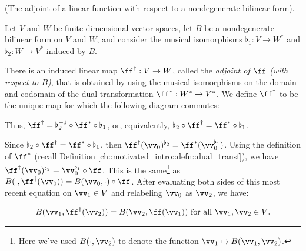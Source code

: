 \begin{deriv}
\label{ch::bilinear_forms_metric_tensors::defn::dual_transf_after_id}
    (The adjoint of a linear function with respect to a nondegenerate bilinear form).
    
    Let $V$ and $W$ be finite-dimensional vector spaces, let $B$ be a nondegenerate bilinear form on $V$ and $W$, and consider the musical isomorphisms $\flat_1:V \rightarrow W^{*}$ and $\flat_2:W \rightarrow V^{*}$ induced by $B$.
    
    There is an induced linear map $\ff^\dag:V \rightarrow W$, called the \textit{adjoint of $\ff$ (with respect to $B$)}, that is obtained by using the musical isomorphisms on the domain and codomain of the dual transformation $\ff^*:W^* \rightarrow V^*$. We define $\ff^\dag$ to be the unique map for which the following diagram commutes:
    
    \begin{center}
    \end{center}
    
    Thus, $\ff^\dag = \flat_2^{-1} \circ \ff^* \circ \flat_1$, or, equivalently, $\flat_2 \circ \ff^\dag = \ff^* \circ \flat_1$.
    
    Since $\flat_2 \circ \ff^\dag = \ff^* \circ \flat_1$, then $\ff^\dag(\vv_0)^{\flat_2} = \ff^*(\vv_0^{\flat_1})$. Using the definition of $\ff^*$ (recall Definition \ref{ch::motivated_intro::defn::dual_transf}), we have $\ff^\dag(\vv_0)^{\flat_2} = \vv_0^{\flat_1} \circ \ff$. This is the same\footnote{Here we've used $B(\cdot, \vv_2)$ to denote the function $\vv_1 \mapsto B(\vv_1, \vv_2)$.} as $B(\cdot, \ff^\dag(\vv_0)) = B(\vv_0, \cdot) \circ \ff$. After evaluating both sides of this most recent equation on $\vv_1 \in V$ and relabeling $\vv_0$ as $\vv_2$, we have:
    
    \begin{align*}
        B(\vv_1, \ff^\dag(\vv_2)) = B(\vv_2, \ff(\vv_1)) \text{ for all $\vv_1, \vv_2 \in V$}.
    \end{align*}
\end{deriv}


